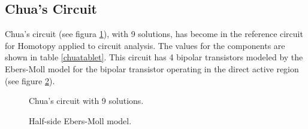 \documentclass[conference,letterpaper,onecolumn]{IEEEtran}
\begin{document}
{\subsection{Chua's Circuit}

Chua's circuit \cite{homo_chua} (see figura \ref{chua}), with 9 solutions, has become in the reference circuit for Homotopy applied to circuit analysis. The values for the components are shown in table \ref{chuatablet}. This circuit has 4 bipolar transistors modeled by the Ebers-Moll model for the bipolar transistor operating in the direct active region (see figure \ref{eber}).

\begin{table}[hbtp]
\caption{Component values for Chua's circuit.}
\label{chuatablet}
\end{table}

\begin{figure}[hbtp]
\centerline{
\epsfxsize=70mm
}
\caption{Chua's circuit with 9 solutions.}
\label{chua}
\end{figure}


\begin{figure}[hbtp]
\centerline{
\epsfxsize=35mm
}
\caption{Half-side Ebers-Moll model.}
\label{eber}
\end{figure}

}
\end{document}
